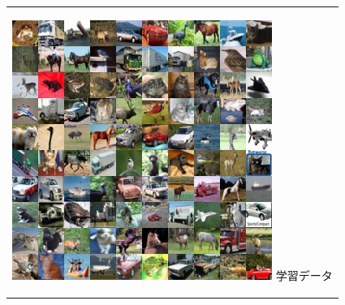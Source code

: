 \documentclass[12pt]{jsarticle}
\begin{document}
\begin{figure}[h]
  \begin{center}
    \begin{tabular}{c}

      \begin{minipage}{0.33\hsize}
        \begin{center}
          \includegraphics[clip, width=\linewidth]{cyfer_ans.jpg}
          \hspace{0.2cm} 学習データ
        \end{center}
      \end{minipage}


\end{tabular}
\end{center}
\end{figure}
\end{document}
